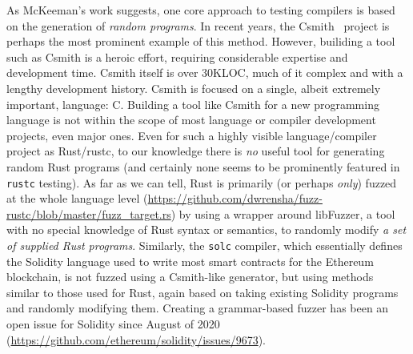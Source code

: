 As McKeeman's work suggests, one core approach to testing compilers is
based on
the generation of \emph{random programs}.  In recent
years, the Csmith~\cite{csmith} project is perhaps the most prominent
example of this method.  However, builiding a tool such as Csmith
is a heroic effort, requiring considerable expertise and
development time.  Csmith itself is over 30KLOC, much of it complex
and with a lengthy development history.  Csmith is focused on a
single, albeit extremely important, language: C.  Building a tool like
Csmith for a new programming language is not within the scope of most
language or compiler development projects, even major ones.  Even for such a highly
visible language/compiler project as Rust/rustc, to our knowledge
there is \emph{no} useful tool for generating random Rust programs
(and certainly none seems to be
prominently featured in {\tt rustc} testing).  As far as we can tell, Rust
is primarily (or perhaps \emph{only}) fuzzed at the whole language
level
(\url{https://github.com/dwrensha/fuzz-rustc/blob/master/fuzz_target.rs}) by
using a wrapper around libFuzzer, a tool with no special knowledge of Rust
syntax or semantics, to randomly modify \emph{a set of supplied Rust
programs}.  Similarly, the {\tt solc} compiler, which essentially
defines the Solidity language used to write most smart contracts for
the Ethereum blockchain, is not fuzzed using a Csmith-like
generator, but using methods similar to those used for
Rust, again based on taking
existing Solidity programs and randomly modifying them.  Creating a
grammar-based fuzzer has been an open issue for Solidity since August
of 2020 (\url{https://github.com/ethereum/solidity/issues/9673}).

